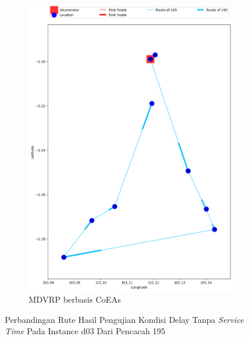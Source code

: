 \begin{figure}[H]
	\centering
	\begin{subfigure}[t]{\textwidth}
		\centering
		\includegraphics[width=\textwidth]{Resources/Images/delayed_3/real_m15_n100_delayed_3_195_coes}
		\caption{MDVRP berbasis CoEAs}
		\label{fig:real_m15_n100_delayed_3_195_coes}
	\end{subfigure}
	\caption{Perbandingan Rute Hasil Pengujian Kondisi Delay Tanpa \textit{Service Time} Pada Instance d03 Dari Pencacah 195}
	\label{fig:real_m15_n100_delayed_3_195}
\end{figure}


